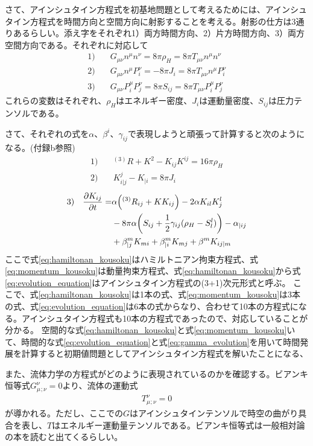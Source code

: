 \documentclass[autodetect-engine,dvi=dvipdfmx,ja=standard, 10pt, a4paper]{bxjsarticle}
\begin{document}
さて、アインシュタイン方程式を初基地問題として考えるためには、アインシュタイン方程式を時間方向と空間方向に射影することを考える。射影の仕方は3通りあるらしい。添え字をそれぞれ1）両方時間方向、2）片方時間方向、3）両方空間方向である。それぞれに対応して
\begin{align}
	1) \quad & G_{\mu\nu}n^\mu n^\nu = 8\pi \rho_H = 8\pi T_{\mu\nu}n^\mu n^\nu\label{eq:energy_constraint}\\
	2) \quad & G_{\mu\nu}n^\mu P^\nu_i = -8\pi J_i = 8\pi T_{\mu\nu}n^\mu P^\nu_i\label{eq:momentum_constraint}\\
	3) \quad & G_{\mu\nu}P^\mu_i P^\nu_j = 8\pi S_{ij} = 8\pi T_{\mu\nu}P^\mu_i P^\nu_j\label{eq:space_space}
\end{align}
これらの変数はそれぞれ、$\rho_H$はエネルギー密度、$J_i$は運動量密度、$S_{ij}$は圧力テンソルである。

さて、それぞれの式を$\alpha$、$\beta^i$、$\gamma_{ij}$で表現しようと頑張って計算すると次のようになる。(付録b参照)
\begin{align}
	1) \quad & ^{(3)}R + K^2 - K_{ij}K^{ij} = 16\pi \rho_H
	\label{eq:hamiltonan_kousoku}\\
	2) \quad & K^j_{i|j} - K_{|i} = 8\pi J_i
	\label{eq:momentum_kousoku}
\end{align}
\begin{align}
	3) \quad  \pdv{K_{ij}}{t} = & \alpha \qty(^{(3)}R_{ij} + K K_{ij} ) -2\alpha K_{il}K^l_j\nonumber\\
	& -8\pi\alpha\qty( S_{ij} + \frac{1}{2}\gamma_{ij}(\rho_H-S^l_l)) -\alpha_{|ij} \\
	& + \beta^m_{|j} K_{mi} + \beta^m_{|i} K_{mj} + \beta^m K_{ij|m}
	\label{eq:evolution_equation}
\end{align}
ここで式\eqref{eq:hamiltonan_kousoku}はハミルトニアン拘束方程式、式\eqref{eq:momentum_kousoku}は動量拘束方程式、式\eqref{eq:hamiltonan_kousoku}から式\eqref{eq:evolution_equation}はアインシュタイン方程式の(3+1)次元形式と呼ぶ。
ここで、式\eqref{eq:hamiltonan_kousoku}は1本の式、式\eqref{eq:momentum_kousoku}は3本の式、式\eqref{eq:evolution_equation}は6本の式からなり、合わせて10本の方程式になる。アインシュタイン方程式も10本の方程式であったので、対応していることが分かる。
空間的な式\eqref{eq:hamiltonan_kousoku}と式\eqref{eq:momentum_kousoku}いて、時間的な式\eqref{eq:evolution_equation}と式\eqref{eq:gamma_evolution}を用いて時間発展を計算すると初期値問題としてアインシュタイン方程式を解いたことになる、

また、流体力学の方程式がどのように表現されているのかを確認する。ビアンキ恒等式$G_{\mu}^{\nu}{}_{;\nu}=0$より、流体の運動式
\begin{align}
	T_{\mu}^{\nu}{}_{;\nu} = 0
\end{align}
が導かれる。ただし、ここでの$G$はアインシュタインテンソルで時空の曲がり具合を表し、$T$はエネルギー運動量テンソルである。ビアンキ恒等式は一般相対論の本を読むと出てくるらしい。
\end{document}
